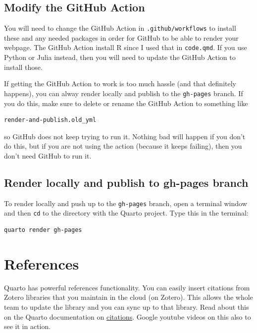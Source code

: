 \documentclass[
  letterpaper,
  oneside,
  open=any]{scrbook}
\begin{document}
\section{Modify the GitHub Action}\label{modify-the-github-action}

You will need to change the GitHub Action in \texttt{.github/workflows}
to install these and any needed packages in order for GitHub to be able
to render your webpage. The GitHub Action install R since I used that in
\texttt{code.qmd}. If you use Python or Julia instead, then you will
need to update the GitHub Action to install those.

If getting the GitHub Action to work is too much hassle (and that
definitely happens), you can alway render locally and publish to the
\texttt{gh-pages} branch. If you do this, make sure to delete or rename
the GitHub Action to something like

\begin{verbatim}
render-and-publish.old_yml
\end{verbatim}

so GitHub does not keep trying to run it. Nothing bad will happen if you
don't do this, but if you are not using the action (because it keeps
failing), then you don't need GitHub to run it.

\section{Render locally and publish to gh-pages
branch}\label{render-locally-and-publish-to-gh-pages-branch}

To render locally and push up to the \texttt{gh-pages} branch, open a
terminal window and then \texttt{cd} to the directory with the Quarto
project. Type this in the terminal:

\begin{verbatim}
quarto render gh-pages
\end{verbatim}


\chapter{References}\label{references}

Quarto has powerful references functionality. You can easily insert
citations from Zotero libraries that you maintain in the cloud (on
Zotero). This allows the whole team to update the library and you can
sync up to that library. Read about this on the Quarto documentation on
\href{https://quarto.org/docs/visual-editor/technical.html\#citations}{citations}.
Google youtube videos on this also to see it in action.
\end{document}
